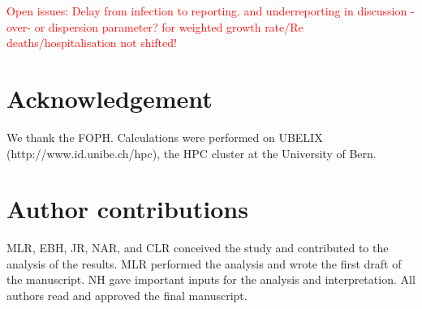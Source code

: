 \documentclass[10pt, a4paper, twoside]{article}
\begin{document}
\begin{multicols}{2}
\textcolor{red}{Open issues: Delay from infection to reporting. and underreporting in discussion - over- or dispersion parameter? for weighted growth rate/Re deaths/hospitalisation not shifted! }
\section{Acknowledgement}
We thank the FOPH.  Calculations were performed on UBELIX (http://www.id.unibe.ch/hpc), the HPC cluster at the University of Bern.

\section{Author contributions}
MLR, EBH, JR, NAR, and CLR conceived the study and contributed to the analysis of the results. 
MLR performed the analysis and wrote the first draft of the manuscript. 
NH gave important inputs for the analysis and interpretation. 
All authors read and approved the final manuscript.


\end{multicols}
\end{document}
